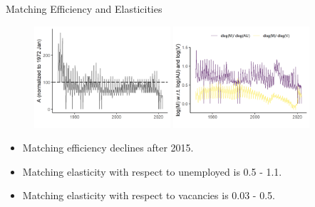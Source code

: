 \documentclass[aspectratio=169]{beamer}
\begin{document}
\begin{frame}{Matching Efficiency and Elasticities}
    \begin{figure}[!ht]
  \begin{center}
  \includegraphics[width = 0.45\textwidth]
  {figuretable/matching_efficiency_month_aggregate.png}
  \includegraphics[width = 0.45\textwidth]
  {figuretable/elasticity_month_aggregate.png}
  \end{center}
  \footnotesize
\end{figure} 
\begin{itemize}
    \item Matching efficiency declines after 2015.
    \item Matching elasticity with respect to unemployed is 0.5 - 1.1.
    \item Matching elasticity with respect to vacancies is 0.03 - 0.5.
\end{itemize}
\end{frame}
\end{document}

